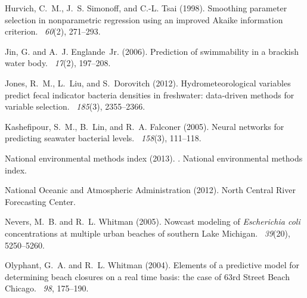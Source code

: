 \documentclass[authoryear,review, 12pt]{elsarticle}
\begin{document}
\begin{thebibliography}{}
Hurvich, C.~M., J.~S. Simonoff, and C.-L. Tsai (1998).
\newblock Smoothing parameter selection in nonparametric regression using an
  improved {A}kaike information criterion.
~{\em 60\/}(2), 271--293.

Jin, G. and A.~J. Englande~Jr. (2006).
\newblock Prediction of swimmability in a brackish water body.
~{\em 17\/}(2), 197--208.

Jones, R.~M., L.~Liu, and S.~Dorovitch (2012).
\newblock Hydrometeorological variables predict fecal indicator bacteria
  densities in freshwater: data-driven methods for variable selection.
~{\em 185\/}(3),
  2355--2366.

Kashefipour, S.~M., B.~Lin, and R.~A. Falconer (2005).
\newblock Neural networks for predicting seawater bacterial levels.
~{\em 158\/}(3), 111--118.

National environmental methods index (2013).
.
\newblock National environmental methods index.

{National Oceanic and Atmospheric Administration} (2012).
\newblock North {C}entral {R}iver {F}orecasting {C}enter.

Nevers, M.~B. and R.~L. Whitman (2005).
\newblock Nowcast modeling of \emph{{E}scherichia coli} concentrations at multiple
  urban beaches of southern {Lake Michigan}.
~{\em 39\/}(20), 5250--5260.

Olyphant, G.~A. and R.~L. Whitman (2004).
\newblock Elements of a predictive model for determining beach closures on a
  real time basis: the case of 63rd {S}treet {B}each {C}hicago.
~{\em 98}, 175--190.


\end{thebibliography}
\end{document}
